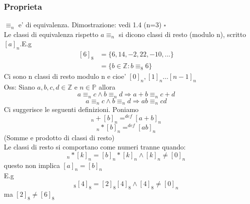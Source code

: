 \documentclass{article}
\begin{document}
     \subsubsection{Proprieta}
     \begin{flushleft}
       $\equiv_n$ e' di equivalenza. Dimostrazione: vedi 1.4 (n=3) $\square$\\ 
       Le classi di equivalenza rispetto $a \equiv_n$ si dicono classi di resto (modulo n), scritto $[a]_n$.E.g
       \begin{equation}
         \begin{split}
           [6]_8 & = \{6,14,-2,22,-10,...\}\\
           & = \{ b\in \mathbb{Z}:b \equiv_8 6 \}
         \end{split}
       \end{equation}
       Ci sono n classi di resto modulo n e cioe' $[0]_n,[1]_n...[n-1]_n$ \\ 
       Oss: Siano $a,b,c,d \in \mathbb{Z}$ e $n \in \mathbb{P}$ allora
       \begin{equation}
         a \equiv_n c \land b\equiv_n d \Rightarrow a+b \equiv_n c+d
       \end{equation}
       \begin{equation}
         a \equiv_n c \land b\equiv_n d \Rightarrow ab \equiv_n cd
       \end{equation}
       Ci suggerisce le seguenti definizioni.
       Poniamo 
       \begin{equation}
         [a]_n + [b]_n =^{def} [a+b]_n
       \end{equation}
       \begin{equation}
         [a]_n * [b]_n =^{def} [ab]_n
       \end{equation}
       (Somme e prodotto di classi di resto)\\ 
       Le classi di resto si comportano come numeri tranne quando:
       \begin{equation}
        [a]_n * [k]_n = [b]_n * [k]_n \land [k]_n \neq [0]_n
       \end{equation}
       questo non implica $[a]_n = [b]_n$ \\ 
       E.g
       \begin{equation}
         [6]_8 [4]_8 = [2]_8 [4]_8 \land [4]_8 \neq [0]_n
       \end{equation}
        ma $[2]_8 \neq [6]_8$
     \end{flushleft}
\end{document}
